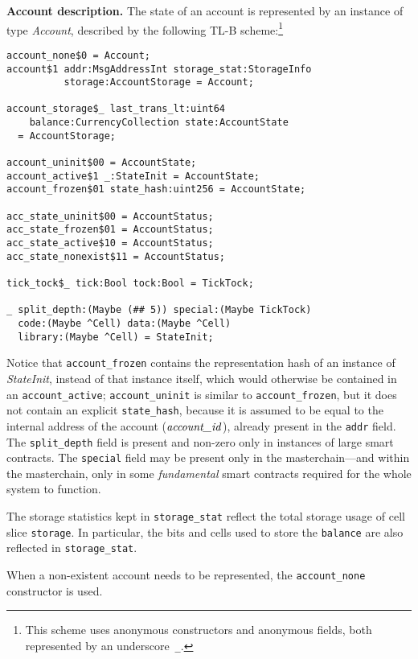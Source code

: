 \documentclass[12pt,oneside]{article}
\def\makepoint#1{\medbreak\noindent{\bf #1.\ }}
\def\nxsubpoint{\refstepcounter{subsubsection}%
  \smallbreak\makepoint{\thesubsubsection}}
\def\emb#1{\textbf{#1.}}
\let\vr=\textit
\def\accountid{\vr{account\_id\/}}
\begin{document}
\nxsubpoint\label{sp:acc.descr}\emb{Account description}
The state of an account is represented by an instance of type {\em Account}, described by the following TL-B scheme:\footnote{This scheme uses anonymous constructors and anonymous fields, both represented by an underscore~{\tt \_}.}
\begin{verbatim}
account_none$0 = Account;
account$1 addr:MsgAddressInt storage_stat:StorageInfo
          storage:AccountStorage = Account;

account_storage$_ last_trans_lt:uint64
    balance:CurrencyCollection state:AccountState
  = AccountStorage;

account_uninit$00 = AccountState;
account_active$1 _:StateInit = AccountState;
account_frozen$01 state_hash:uint256 = AccountState;

acc_state_uninit$00 = AccountStatus;
acc_state_frozen$01 = AccountStatus;
acc_state_active$10 = AccountStatus;
acc_state_nonexist$11 = AccountStatus;

tick_tock$_ tick:Bool tock:Bool = TickTock;

_ split_depth:(Maybe (## 5)) special:(Maybe TickTock)
  code:(Maybe ^Cell) data:(Maybe ^Cell)
  library:(Maybe ^Cell) = StateInit;
\end{verbatim}
Notice that {\tt account\_frozen} contains the representation hash of an instance of {\em StateInit}, instead of that instance itself, which would otherwise be contained in an {\tt account\_active}; {\tt account\_uninit} is similar to {\tt account\_frozen}, but it does not contain an explicit {\tt state\_hash}, because it is assumed to be equal to the internal address of the account ($\accountid$), already present in the \texttt{addr} field. The {\tt split\_depth} field is present and non-zero only in instances of large smart contracts. The {\tt special} field may be present only in the masterchain---and within the masterchain, only in some {\em fundamental\/} smart contracts required for the whole system to function.

The storage statistics kept in {\tt storage\_stat} reflect the total storage usage of cell slice {\tt storage}. In particular, the bits and cells used to store the {\tt balance} are also reflected in {\tt storage\_stat}.

When a non-existent account needs to be represented, the {\tt account\_none} constructor is used.
\end{document}
